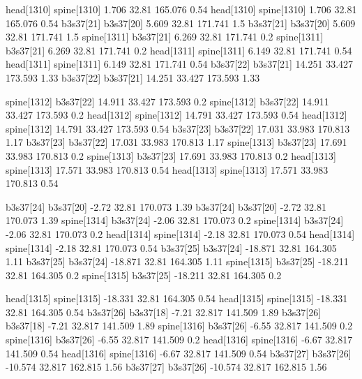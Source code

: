 head[1310]    spine[1310]    1.706    32.81    165.076    0.54
head[1310]    spine[1310]    1.706    32.81    165.076    0.54
b3s37[21]    b3s37[20]    5.609    32.81    171.741    1.5
b3s37[21]    b3s37[20]    5.609    32.81    171.741    1.5
spine[1311]    b3s37[21]    6.269    32.81    171.741    0.2
spine[1311]    b3s37[21]    6.269    32.81    171.741    0.2
head[1311]    spine[1311]    6.149    32.81    171.741    0.54
head[1311]    spine[1311]    6.149    32.81    171.741    0.54
b3s37[22]    b3s37[21]    14.251    33.427    173.593    1.33
b3s37[22]    b3s37[21]    14.251    33.427    173.593    1.33


spine[1312]    b3s37[22]    14.911    33.427    173.593    0.2
spine[1312]    b3s37[22]    14.911    33.427    173.593    0.2
head[1312]    spine[1312]    14.791    33.427    173.593    0.54
head[1312]    spine[1312]    14.791    33.427    173.593    0.54
b3s37[23]    b3s37[22]    17.031    33.983    170.813    1.17
b3s37[23]    b3s37[22]    17.031    33.983    170.813    1.17
spine[1313]    b3s37[23]    17.691    33.983    170.813    0.2
spine[1313]    b3s37[23]    17.691    33.983    170.813    0.2
head[1313]    spine[1313]    17.571    33.983    170.813    0.54
head[1313]    spine[1313]    17.571    33.983    170.813    0.54


b3s37[24]    b3s37[20]    -2.72    32.81    170.073    1.39
b3s37[24]    b3s37[20]    -2.72    32.81    170.073    1.39
spine[1314]    b3s37[24]    -2.06    32.81    170.073    0.2
spine[1314]    b3s37[24]    -2.06    32.81    170.073    0.2
head[1314]    spine[1314]    -2.18    32.81    170.073    0.54
head[1314]    spine[1314]    -2.18    32.81    170.073    0.54
b3s37[25]    b3s37[24]    -18.871    32.81    164.305    1.11
b3s37[25]    b3s37[24]    -18.871    32.81    164.305    1.11
spine[1315]    b3s37[25]    -18.211    32.81    164.305    0.2
spine[1315]    b3s37[25]    -18.211    32.81    164.305    0.2


head[1315]    spine[1315]    -18.331    32.81    164.305    0.54
head[1315]    spine[1315]    -18.331    32.81    164.305    0.54
b3s37[26]    b3s37[18]    -7.21    32.817    141.509    1.89
b3s37[26]    b3s37[18]    -7.21    32.817    141.509    1.89
spine[1316]    b3s37[26]    -6.55    32.817    141.509    0.2
spine[1316]    b3s37[26]    -6.55    32.817    141.509    0.2
head[1316]    spine[1316]    -6.67    32.817    141.509    0.54
head[1316]    spine[1316]    -6.67    32.817    141.509    0.54
b3s37[27]    b3s37[26]    -10.574    32.817    162.815    1.56
b3s37[27]    b3s37[26]    -10.574    32.817    162.815    1.56


